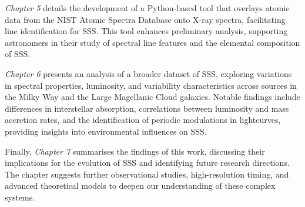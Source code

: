     \textit{Chapter 5} details the development of a Python-based tool that overlays atomic data from the NIST Atomic Spectra Database onto X-ray spectra, facilitating line identification for SSS. This tool enhances preliminary analysis, supporting astronomers in their study of spectral line features and the elemental composition of SSS.
    
    \textit{Chapter 6} presents an analysis of a broader dataset of SSS, exploring variations in spectral properties, luminosity, and variability characteristics across sources in the Milky Way and the Large Magellanic Cloud galaxies. Notable findings include differences in interstellar absorption, correlations between luminosity and mass accretion rates, and the identification of periodic modulations in lightcurves, providing insights into environmental influences on SSS.
    
    Finally, \textit{Chapter 7} summarises the findings of this work, discussing their implications for the evolution of SSS and identifying future research directions. The chapter suggests further observational studies, high-resolution timing, and advanced theoretical models to deepen our understanding of these complex systems.